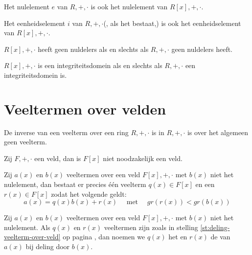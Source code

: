 \documentclass[main.tex]{subfiles}
\begin{document}
\begin{st}
  Het nulelement $e$ van $R,+,\cdot$ is ook het nulelement van $R[x],+,\cdot$.
\end{st}

\begin{st}
  Het eenheidselement $i$ van $R,+,\cdot$(, als het bestaat,) is ook het eenheidselement van $R[x],+,\cdot$.
\end{st}

\begin{st}
  $R[x],+,\cdot$ heeft geen nuldelers als en slechts als $R,+,\cdot$ geen nuldelers heeft.
\end{st}

\begin{gev}
  $R[x],+,\cdot$ is een integriteitsdomein als en slechts als $R,+,\cdot$ een integriteitsdomein is.
\end{gev}


\section{Veeltermen over velden}
\label{sec:veelt-over-veld}

\begin{opm}
  De inverse van een veelterm over een ring $R,+,\cdot$ is in $R,+,\cdot$ is over het algemeen geen veelterm.
\end{opm}

\begin{opm}
  Zij $F,+,\cdot$ een veld, dan is $F[x]$ niet noodzakelijk een veld.
\end{opm}

\begin{st}
  \label{st:deling-veelterm-over-veld}
  Zij $a(x)$ en $b(x)$ veeltermen over een veld $F[x],+,\cdot$ met $b(x)$ niet het nulelement, dan bestaat er precies \'e\'en veelterm $q(x) \in F[x]$ en een $r(x) \in F[x]$ zodat het volgende geldt:
  \[ a(x) = q(x)b(x) + r(x) \quad\text{ met }\quad gr(r(x)) < gr(b(x)) \]
\end{st}

\begin{de}
  Zij $a(x)$ en $b(x)$ veeltermen over een veld $F[x],+,\cdot$ met $b(x)$ niet het nulelement.
  Als $q(x)$ en $r(x)$ veeltermen zijn zoals in stelling \ref{st:deling-veelterm-over-veld} op pagina \pageref{st:deling-veelterm-over-veld}, dan noemen we $q(x)$ het  en $r(x)$ de  van $a(x)$ bij deling door $b(x)$.
\end{de}
\end{document}
